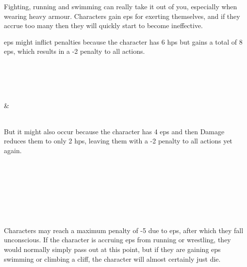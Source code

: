 \begin{multicols}{2}

\label{ep}

\noindent
Fighting, running and swimming can really take it out of you, especially when wearing heavy armour.
Characters gain \glspl{ep} for exerting themselves, and if they accrue too many then they will quickly start to become ineffective.



\noindent
\Glspl{ep} might inflict penalties because the character has 6 \glspl{hp} but gains a total of 8 \glspl{ep}, which results in a -2 penalty to all actions.

\begin{boxtable}[lllllllllX]

   \\
    \statCircle
  \\
   \Square
  \\
   \\
   \Square & \Square \\
   \\

\end{boxtable}

But it might also occur because the character has 4 \glspl{ep} and then Damage reduces them to only 2 \glspl{hp}, leaving them with a -2 penalty to all actions yet again.

\begin{boxtable}[lllllllllX]

   \\
    \statCircle
  \\
     \Square
  \\
   \\
    \Square \\
   \\

\end{boxtable}

Characters may reach a maximum penalty of -5 due to \glspl{ep}, after which they fall unconscious.
If the character is accruing \glspl{ep} from running or wrestling, they would normally simply pass out at this point, but if they are gaining \glspl{ep} swimming or climbing a cliff, the character will almost certainly just die.


\end{multicols}
